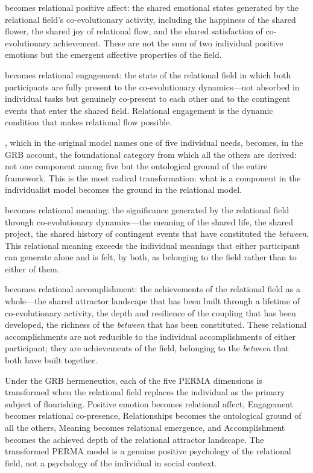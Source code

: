  becomes relational positive affect: the shared emotional states generated by the relational field's co-evolutionary activity, including the happiness of the shared flower, the shared joy of relational flow, and the shared satisfaction of co-evolutionary achievement. These are not the sum of two individual positive emotions but the emergent affective properties of the field.

 becomes relational engagement: the state of the relational field in which both participants are fully present to the co-evolutionary dynamics---not absorbed in individual tasks but genuinely co-present to each other and to the contingent events that enter the shared field. Relational engagement is the dynamic condition that makes relational flow possible.

, which in the original model names one of five individual needs, becomes, in the GRB account, the foundational category from which all the others are derived: not one component among five but the ontological ground of the entire framework. This is the most radical transformation: what is a component in the individualist model becomes the ground in the relational model.

 becomes relational meaning: the significance generated by the relational field through co-evolutionary dynamics---the meaning of the shared life, the shared project, the shared history of contingent events that have constituted the \emph{between}. This relational meaning exceeds the individual meanings that either participant can generate alone and is felt, by both, as belonging to the field rather than to either of them.

 becomes relational accomplishment: the achievements of the relational field as a whole---the shared attractor landscape that has been built through a lifetime of co-evolutionary activity, the depth and resilience of the coupling that has been developed, the richness of the \emph{between} that has been constituted. These relational accomplishments are not reducible to the individual accomplishments of either participant; they are achievements of the field, belonging to the \emph{between} that both have built together.

\begin{claim}
Under the GRB hermeneutics, each of the five PERMA dimensions is transformed when the relational field replaces the individual as the primary subject of flourishing. Positive emotion becomes relational affect, Engagement becomes relational co-presence, Relationships becomes the ontological ground of all the others, Meaning becomes relational emergence, and Accomplishment becomes the achieved depth of the relational attractor landscape. The transformed PERMA model is a genuine positive psychology of the relational field, not a psychology of the individual in social context.
\end{claim}


